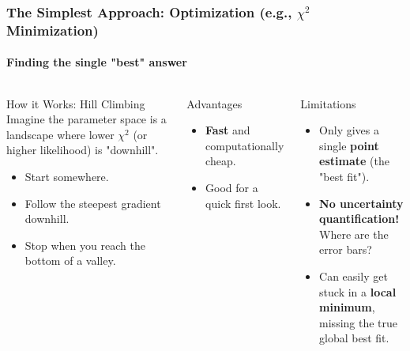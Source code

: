 \documentclass[aspectratio=169]{beamer}
\newcommand{\keyterm}[1]{\textbf{\textcolor{blue!70!black}{#1}}}
\begin{document}
\begin{frame}
    \frametitle{The Simplest Approach: Optimization (e.g., $\chi^2$ Minimization)}
    \framesubtitle{Finding the single "best" answer}
    
    \begin{columns}[T]
        \begin{block}{How it Works: Hill Climbing}
            Imagine the parameter space is a landscape where lower $\chi^2$ (or higher likelihood) is "downhill".
            \begin{itemize}
                \item Start somewhere.
                \item Follow the steepest gradient downhill.
                \item Stop when you reach the bottom of a valley.
            \end{itemize}
        \end{block}
        
        \begin{block}{Advantages}
            \begin{itemize}
                \item \keyterm{Fast} and computationally cheap.
                \item Good for a quick first look.
            \end{itemize}
        \end{block}
        
        \begin{block}{Limitations}
            \begin{itemize}
                \item Only gives a single \keyterm{point estimate} (the "best fit").
                \item \textbf{No uncertainty quantification!} Where are the error bars?
                \item Can easily get stuck in a \keyterm{local minimum}, missing the true global best fit.
            \end{itemize}
        \end{block}
        

\end{columns}
\end{frame}
\end{document}

